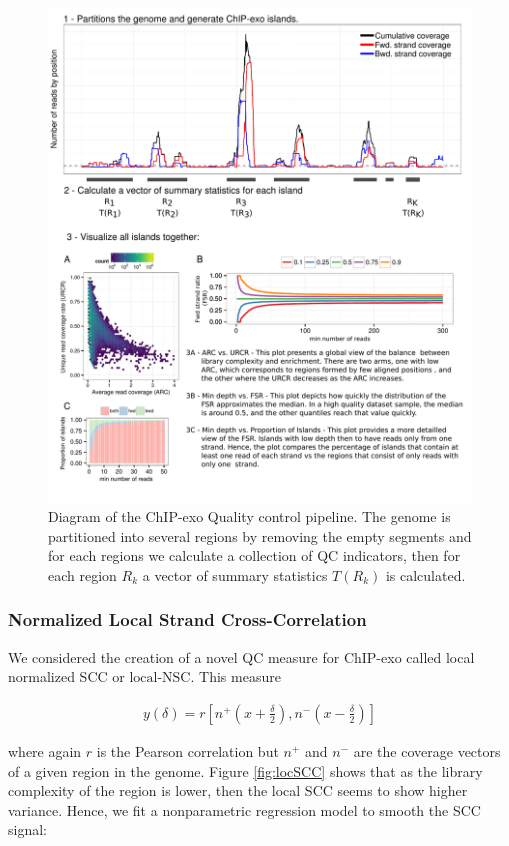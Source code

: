 \documentclass[11pt]{article}\usepackage[]{graphicx}\usepackage[]{color}
\begin{document}
\begin{figure}[H]
  \centering
  \includegraphics[width = .7\textwidth]{../figs/for_paper/coverage_diagram2.pdf}
  \caption{Diagram of the ChIP-exo Quality control pipeline. The
    genome is partitioned into several regions by removing the empty
    segments and for each regions we calculate a collection of QC
    indicators, then for each region $R_k$ a vector of summary
    statistics $T(R_k)$ is calculated.}
  \label{fig:qcdiagram}
\end{figure}

\subsubsection{Normalized Local Strand Cross-Correlation}
\label{sec:locNSC}

We considered the creation of a novel QC measure for ChIP-exo called
local normalized SCC or $\mbox{local-NSC}$. This measure 

\begin{align}
  y(\delta) = r\left[ n^+ \left(x + \frac{\delta}{2}
    \right), n^- \left( x- \frac{\delta}{2} \right)\right]
\nonumber
\end{align}

where again $r$ is the Pearson correlation but $n^+$ and $n^-$ are the
coverage vectors of a given region in the genome. Figure
\ref{fig:locSCC} shows that as the library complexity of the region is
lower, then the local SCC seems to show higher variance. Hence, we
fit a nonparametric regression model to smooth the SCC signal:
\end{document}
